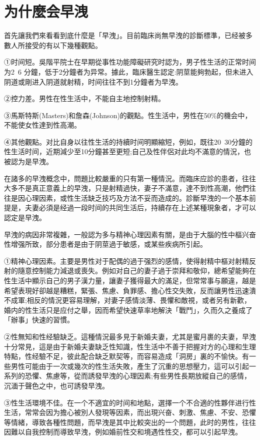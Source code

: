 \documentclass[12pt,UTF8]{ctexbook}
\begin{document}
\section{为什麼会早洩}

首先讓我們來看看到底什麼是「早洩」。目前臨床尚無早洩的診斷標準，已经被多數人所接受的有以下幾種觀點。

①时间短。吳階平院士在早期從事性功能障礙研究时認为，男子性生活的正常时间为2~6 分鐘，低于2分鐘者为异常。據此，臨床醫生認定:阴莖能夠勃起，但未进入阴道或剛进入阴道就射精，时间往往不到1分鐘者为早洩。

②控力差。男性在性生活中，不能自主地控制射精。

③馬斯特斯(Masters)和詹森(Johnson)的觀點。性生活中，男性在50\%的機会中，不能使女性達到性高潮。

④其他觀點。对比自身以往性生活的持續时间明顯縮短，例如，既往20~30分鐘的性生活时间，近期減少至10分鐘甚至更短;自己及性伴侶对此均不滿意的情況，也被認为是早洩。

在諸多的早洩概念中，問題比較嚴重的只有第一種情況。而臨床应診的患者，往往大多不是真正意義上的早洩，只是射精過快，妻子不滿意，達不到性高潮，他們往往是因心理因素，或性生活缺乏技巧及方法不妥而造成的。診斷早洩的一个基本前提是，夫妻必須是经過一段时间的共同生活后，持續存在上述某種現象者，才可以認定是早洩。

早洩的病因非常複雜，一般認为多与精神心理因素有關，是由于大腦的性中樞兴奋性增强所致，部分患者是由于阴莖過于敏感，或某些疾病所引起。

①精神心理因素。主要是男性对于配偶的過于强烈的感情，使得射精中樞对射精反射的隨意控制能力減退或喪失。例如对自己的妻子過于崇拜和敬仰，總希望能夠在性生活中顯示自己的男子漢力量，讓妻子獲得最大的滿足，但常常事与願違，越是希望表現好卻越是糟糕，緊張、焦慮、負罪感、擔心性交失敗，反而讓男性迅速潰不成軍;相反的情況更容易理解，对妻子感情淡薄、畏懼和敵視，或者另有新歡，婚内的性生活只是应付之舉，因而希望快速草率地解決「戰鬥」，久而久之養成了「辦事」快速的習慣。

②性無知和性经驗缺乏。這種情況最多見于新婚夫妻，尤其是蜜月裹的夫妻，早洩十分常見，這是由于新婚夫妻缺乏性知識，性生活中不善于把握对方的心理和生理特點，性经驗不足，彼此配合缺乏默契等，而容易造成「洞房」裏的不愉快。有一些男性可能由于一次或幾次的性生活失敗，產生了沉重的思想壓力，這可以引起一系列的恐懼、焦慮等，從而誘發早洩的心理因素;有些男性長期放縱自己的感情，沉湎于聲色之中，也可誘發早洩。

③性生活環境不佳。在一个不適宜的时间和地點，選擇一个不合適的性夥伴进行性生活，常常会因为擔心被別人發現等因素，而出現兴奋、刺激、焦慮、不安、恐懼等情緒，導致各種性問題，而早洩是其中比較突出的一个問題，此时的男性，往往因難以自我控制而導致早洩，例如婚前性交和境遇性性交，都可以引起早洩。
\end{document}
